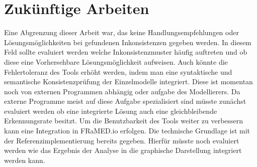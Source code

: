 \section{Zukünftige Arbeiten}

Eine Abgrenzung dieser Arbeit war, das keine Handlungsempfehlungen oder Lösungsmöglichkeiten bei gefundenen Inkonsistenzen gegeben werden.
In diesem Feld sollte evaluiert werden welche Inkonsistenzmuster häufig auftreten und ob diese eine Vorhersehbare Lösungsmöglichkeit aufweisen.
Auch könnte die Fehlertoleranz des Tools erhöht werden, indem man eine syntaktische und semantische Konsistenzprüfung der Einzelmodelle integriert.
Diese ist momentan noch von externen Programmen abhängig oder aufgabe des Modellierers.
Da externe Programme meist auf diese Aufgabe spezialisiert sind müsste zunächst evaluiert werden ob eine integrierte Lösung auch eine gleichbleibende Erkennungsrate besitzt.
Um die Benutzbarkeit des Tools weiter zu verbessern kann eine Integration in FRaMED.io erfolgen.
Die technische Grundlage ist mit der Referenzimplementierung bereits gegeben.
Hierfür müsste noch evaluiert werden wie das Ergebnis der Analyse in die graphische Darstellung integriert werden kann.

